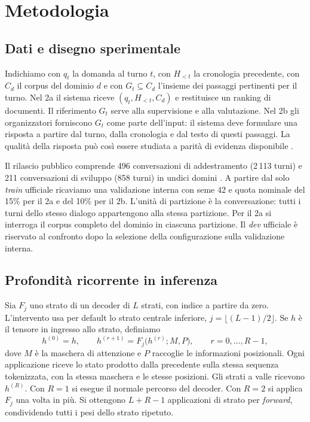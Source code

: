 \section{Metodologia}
\label{sec:metodologia}

\subsection{Dati e disegno sperimentale}
Indichiamo con $q_t$ la domanda al turno $t$, con $H_{<t}$ la cronologia precedente, con $C_d$ il corpus del dominio $d$ e con $G_t\subseteq C_d$ l'insieme dei passaggi pertinenti per il turno. Nel 2a il sistema riceve $(q_t,H_{<t},C_d)$ e restituisce un ranking di documenti. Il riferimento $G_t$ serve alla supervisione e alla valutazione. Nel 2b gli organizzatori forniscono $G_t$ come parte dell'input: il sistema deve formulare una risposta a partire dal turno, dalla cronologia e dal testo di questi passaggi. La qualità della risposta può così essere studiata a parità di evidenza disponibile \cite{reteco,evaluation}.

Il rilascio pubblico comprende 496 conversazioni di addestramento (2\,113 turni) e 211 conversazioni di sviluppo (858 turni) in undici domini \cite{data}. A partire dal solo \emph{train} ufficiale ricaviamo una validazione interna con seme 42 e quota nominale del 15\% per il 2a e del 10\% per il 2b. L'unità di partizione è la conversazione: tutti i turni dello stesso dialogo appartengono alla stessa partizione. Per il 2a si interroga il corpus completo del dominio in ciascuna partizione. Il \emph{dev} ufficiale è riservato al confronto dopo la selezione della configurazione sulla validazione interna.

\subsection{Profondità ricorrente in inferenza}
Sia $F_j$ uno strato di un decoder di $L$ strati, con indice a partire da zero. L'intervento usa per default lo strato centrale inferiore, $j=\lfloor(L-1)/2\rfloor$. Se $h$ è il tensore in ingresso allo strato, definiamo
\begin{equation}
 h^{(0)}=h,\qquad
 h^{(r+1)}=F_j\bigl(h^{(r)};M,P\bigr),
 \qquad r=0,\ldots,R-1,
 \label{eq:metodo-ricorrenza}
\end{equation}
dove $M$ è la maschera di attenzione e $P$ raccoglie le informazioni posizionali. Ogni applicazione riceve lo stato prodotto dalla precedente sulla stessa sequenza tokenizzata, con la stessa maschera e le stesse posizioni. Gli strati a valle ricevono $h^{(R)}$. Con $R=1$ si esegue il normale percorso del decoder. Con $R=2$ si applica $F_j$ una volta in più. Si ottengono $L+R-1$ applicazioni di strato per \emph{forward}, condividendo tutti i pesi dello strato ripetuto.

